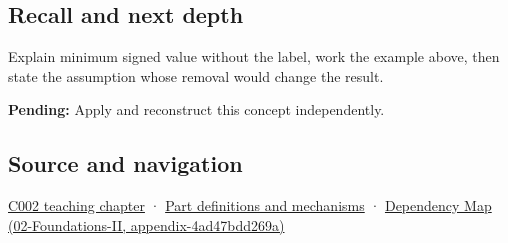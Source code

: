 \subsection{Recall and next depth}\label{appendix-05f39b10364d-recall-and-next-depth}

Explain minimum signed value without the label, work the example above, then state the assumption whose removal would change the result.

\textbf{Pending:} Apply and reconstruct this concept independently.

\subsection{Source and navigation}\label{appendix-05f39b10364d-source-and-navigation}

\hyperref[01-foundations-i-ch001-arithmetic-becomes-a-policy]{C002 teaching chapter} · \hyperref[appendix-fd090d982a15]{Part definitions and mechanisms} · \href{../02-Foundations-II/main.pdf\#nameddest=appendix-4ad47bdd269a}{Dependency Map (02-Foundations-II, appendix-4ad47bdd269a)}
